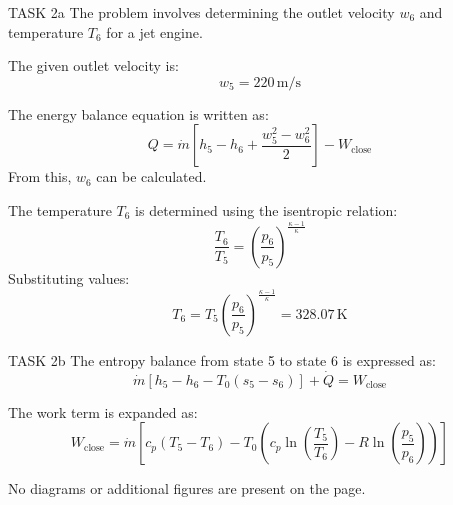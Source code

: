 TASK 2a  
The problem involves determining the outlet velocity \( w_6 \) and temperature \( T_6 \) for a jet engine.  

The given outlet velocity is:  
\[
w_5 = 220 \, \text{m/s}
\]  

The energy balance equation is written as:  
\[
Q = \dot{m} \left[ h_5 - h_6 + \frac{w_5^2 - w_6^2}{2} \right] - W_{\text{close}}
\]  
From this, \( w_6 \) can be calculated.  

The temperature \( T_6 \) is determined using the isentropic relation:  
\[
\frac{T_6}{T_5} = \left( \frac{p_6}{p_5} \right)^{\frac{\kappa - 1}{\kappa}}
\]  
Substituting values:  
\[
T_6 = T_5 \left( \frac{p_6}{p_5} \right)^{\frac{\kappa - 1}{\kappa}} = 328.07 \, \text{K}
\]  

TASK 2b  
The entropy balance from state 5 to state 6 is expressed as:  
\[
\dot{m} \left[ h_5 - h_6 - T_0 (s_5 - s_6) \right] + \dot{Q} = W_{\text{close}}
\]  

The work term is expanded as:  
\[
W_{\text{close}} = \dot{m} \left[ c_p (T_5 - T_6) - T_0 \left( c_p \ln \left( \frac{T_5}{T_6} \right) - R \ln \left( \frac{p_5}{p_6} \right) \right) \right]
\]  

No diagrams or additional figures are present on the page.